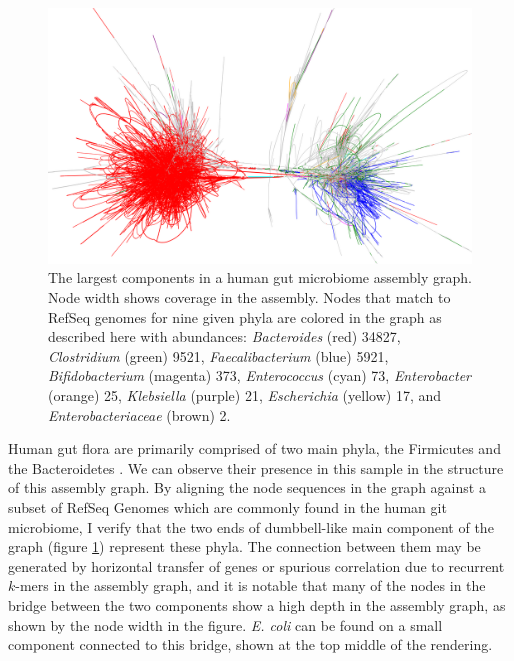 \begin{figure}[htbp!]
  \centering
  \includegraphics[width=1.0\textwidth]{Chapter3/Figs/human_gut_microbiome_phyla_colored_full_between.png}
  \caption[A human gut microbiome]{
    The largest components in a human gut microbiome assembly graph.
    Node width shows coverage in the assembly.
    Nodes that match to RefSeq genomes for nine given phyla are colored in the graph as described here with abundances: \emph{Bacteroides} (red) 34827, \emph{Clostridium} (green) 9521, \emph{Faecalibacterium} (blue) 5921, \emph{Bifidobacterium} (magenta) 373, \emph{Enterococcus} (cyan) 73, \emph{Enterobacter} (orange) 25, \emph{Klebsiella} (purple) 21, \emph{Escherichia} (yellow) 17, and \emph{Enterobacteriaceae} (brown) 2.
  }
  \label{fig:human_gut_microbiome_bandage}
\end{figure}


Human gut flora are primarily comprised of two main phyla, the Firmicutes and the Bacteroidetes \cite{mahowald2009characterizing}.
We can observe their presence in this sample in the structure of this assembly graph.
By aligning the node sequences in the graph against a subset of RefSeq Genomes which are commonly found in the human git microbiome, I verify that the two ends of dumbbell-like main component of the graph (figure \ref{fig:human_gut_microbiome_bandage}) represent these phyla.
The connection between them may be generated by horizontal transfer of genes or spurious correlation due to recurrent $k$-mers in the assembly graph, and it is notable that many of the nodes in the bridge between the two components show a high depth in the assembly graph, as shown by the node width in the figure.
\emph{E. coli} can be found on a small component connected to this bridge, shown at the top middle of the rendering.

